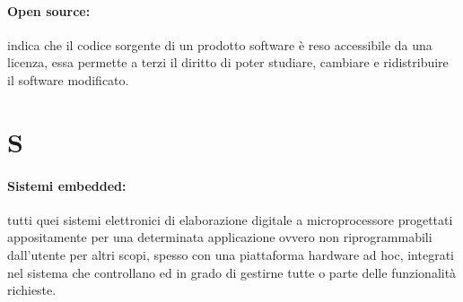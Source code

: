 \paragraph*{Open source:} indica che il codice sorgente di un prodotto software è reso accessibile da una licenza, essa permette a terzi il diritto di poter studiare, cambiare e ridistribuire il software modificato.

\section*{S}
\paragraph*{Sistemi embedded:} tutti quei sistemi elettronici di elaborazione digitale a microprocessore progettati appositamente per una determinata applicazione ovvero non riprogrammabili dall'utente per altri scopi, spesso con una piattaforma hardware ad hoc, integrati nel sistema che controllano ed in grado di gestirne tutte o parte delle funzionalità richieste.

